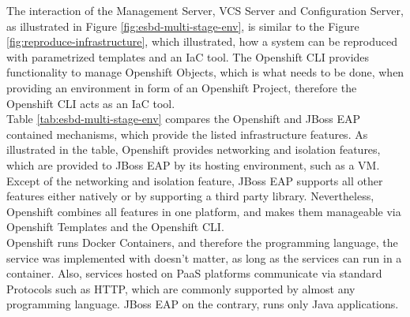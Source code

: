 The interaction of the Management Server, VCS Server and Configuration Server, as illustrated in Figure \vref{fig:esbd-multi-stage-env}, is similar to the Figure \vref{fig:reproduce-infrastructure}, which illustrated, how a system can be reproduced with parametrized templates and an IaC tool. The Openshift CLI provides functionality to manage Openshift Objects, which is what needs to be done, when providing an environment in form of an Openshift Project, therefore the Openshift CLI acts as an IaC tool.  \\

Table \vref{tab:esbd-multi-stage-env} compares the Openshift and JBoss EAP contained mechanisms, which provide the listed infrastructure features. As illustrated in the table, Openshift provides networking and isolation features, which are provided to JBoss EAP by its hosting environment, such as a VM. Except of the networking and isolation feature, JBoss EAP supports all other features either natively or by supporting a third party library. Nevertheless, Openshift combines all features in one platform, and makes them manageable via Openshift Templates and the Openshift CLI. \\

Openshift runs Docker Containers, and therefore the programming language, the service was implemented with doesn't matter, as long as the services can run in a container. Also, services hosted on PaaS platforms communicate via standard Protocols such as HTTP, which are commonly supported by almost any programming language. JBoss EAP on the contrary, runs only Java applications.
\newpage

